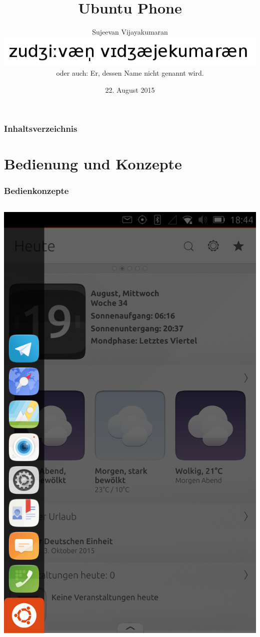 \documentclass{beamer}
\title{Ubuntu Phone}
\author{Sujeevan Vijayakumaran\\
\includegraphics[width=0.3\linewidth]{images/name.png}\\
\tiny{oder auch: Er, dessen Name nicht genannt wird.}}
\date{22. August 2015}
\institute{FrOSCon}
\begin{document}
\maketitle
\begin{frame}
  \frametitle{Inhaltsverzeichnis}
  \tableofcontents
\end{frame}

\section{Bedienung und Konzepte}

\frame{\sectionpage}

\begin{frame}
  \frametitle{Bedienkonzepte}
  \begin{columns}
      \includegraphics[width=\textwidth]{images/unity-launcher}

\end{columns}
\end{frame}
\end{document}
